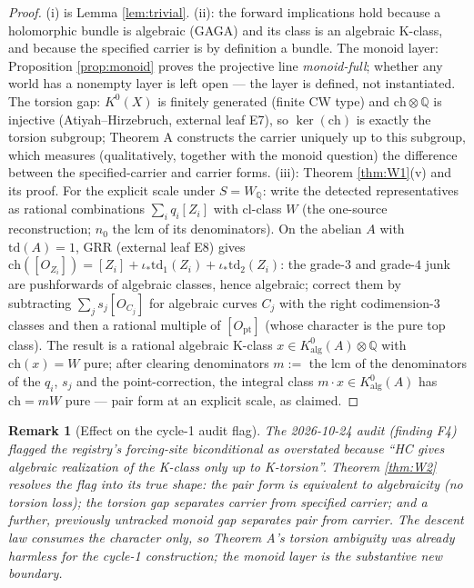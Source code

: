 \documentclass[11pt]{article}
\newtheorem{remark}{Remark}
\begin{document}
\begin{proof}
(i) is Lemma \ref{lem:trivial}. (ii): the forward implications hold because a holomorphic bundle is algebraic
(GAGA) and its class is an algebraic K-class, and because the specified carrier is by definition a bundle. The
monoid layer: Proposition \ref{prop:monoid} proves the projective line \emph{monoid-full}; whether any world has a
nonempty layer is left open --- the layer is defined, not instantiated. The torsion gap:
$K^0(X)$ is finitely generated (finite CW type) and $\mathrm{ch}\otimes\mathbb{Q}$ is injective (Atiyah--Hirzebruch,
external leaf E7), so $\ker(\mathrm{ch})$ is exactly the torsion subgroup; Theorem A constructs the carrier
uniquely up to this subgroup, which measures (qualitatively, together with the monoid question) the difference
between the specified-carrier and carrier forms. (iii): Theorem \ref{thm:W1}(v) and its proof. For the explicit
scale under $S=W_\mathbb{Q}$: write the detected representatives as rational combinations $\sum_i q_i[Z_i]$ with
$\mathrm{cl}$-class $W$ (the one-source reconstruction; $n_0$ the lcm of its denominators). On the abelian $A$
with $\mathrm{td}(A)=1$, GRR (external leaf E8) gives $\mathrm{ch}([O_{Z_i}])=[Z_i]+\iota_*\mathrm{td}_1(Z_i)+\iota_*\mathrm{td}_2(Z_i)$:
the grade-$3$ and grade-$4$ junk are pushforwards of algebraic classes, hence algebraic; correct them by
subtracting $\sum_j s_j[O_{C_j}]$ for algebraic curves $C_j$ with the right codimension-$3$ classes and then a
rational multiple of $[O_{\mathrm{pt}}]$ (whose character is the pure top class). The result is a rational algebraic K-class $x\in K^0_{\mathrm{alg}}(A)\otimes\mathbb{Q}$ with $\mathrm{ch}(x)=W$ pure;
after clearing denominators $m:=$ the lcm of the denominators of the $q_i$, $s_j$ and the point-correction, the
integral class $m\cdot x\in K^0_{\mathrm{alg}}(A)$ has $\mathrm{ch}=mW$ pure --- pair form at an explicit scale, as claimed.
\end{proof}

\begin{remark}[Effect on the cycle-1 audit flag]
The 2026-10-24 audit (finding F4) flagged the registry's forcing-site biconditional as overstated because
``HC gives algebraic realization of the K-class only up to K-torsion''. Theorem \ref{thm:W2} resolves the flag
into its true shape: the pair form is equivalent to algebraicity (no torsion loss); the torsion gap separates
carrier from specified carrier; and a further, previously untracked monoid gap separates pair from carrier. The
descent law consumes the \emph{character} only, so Theorem A's torsion ambiguity was already harmless for the
cycle-1 construction; the monoid layer is the substantive new boundary.
\end{remark}
\end{document}
